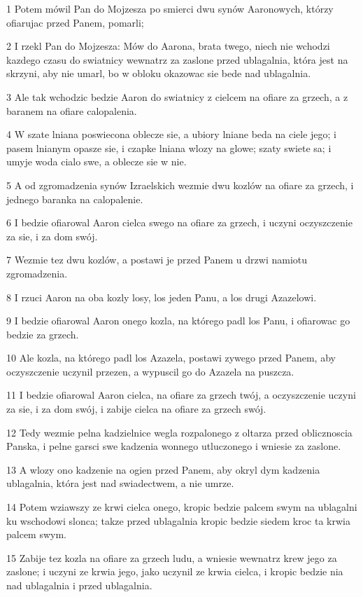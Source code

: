 \par 1 Potem mówil Pan do Mojzesza po smierci dwu synów Aaronowych, którzy ofiarujac przed Panem, pomarli;
\par 2 I rzekl Pan do Mojzesza: Mów do Aarona, brata twego, niech nie wchodzi kazdego czasu do swiatnicy wewnatrz za zaslone przed ublagalnia, która jest na skrzyni, aby nie umarl, bo w obloku okazowac sie bede nad ublagalnia.
\par 3 Ale tak wchodzic bedzie Aaron do swiatnicy z cielcem na ofiare za grzech, a z baranem na ofiare calopalenia.
\par 4 W szate lniana poswiecona oblecze sie, a ubiory lniane beda na ciele jego; i pasem lnianym opasze sie, i czapke lniana wlozy na glowe; szaty swiete sa; i umyje woda cialo swe, a oblecze sie w nie.
\par 5 A od zgromadzenia synów Izraelskich wezmie dwu kozlów na ofiare za grzech, i jednego baranka na calopalenie.
\par 6 I bedzie ofiarowal Aaron cielca swego na ofiare za grzech, i uczyni oczyszczenie za sie, i za dom swój.
\par 7 Wezmie tez dwu kozlów, a postawi je przed Panem u drzwi namiotu zgromadzenia.
\par 8 I rzuci Aaron na oba kozly losy, los jeden Panu, a los drugi Azazelowi.
\par 9 I bedzie ofiarowal Aaron onego kozla, na którego padl los Panu, i ofiarowac go bedzie za grzech.
\par 10 Ale kozla, na którego padl los Azazela, postawi zywego przed Panem, aby oczyszczenie uczynil przezen, a wypuscil go do Azazela na puszcza.
\par 11 I bedzie ofiarowal Aaron cielca, na ofiare za grzech twój, a oczyszczenie uczyni za sie, i za dom swój, i zabije cielca na ofiare za grzech swój.
\par 12 Tedy wezmie pelna kadzielnice wegla rozpalonego z oltarza przed oblicznoscia Panska, i pelne garsci swe kadzenia wonnego utluczonego i wniesie za zaslone.
\par 13 A wlozy ono kadzenie na ogien przed Panem, aby okryl dym kadzenia ublagalnia, która jest nad swiadectwem, a nie umrze.
\par 14 Potem wziawszy ze krwi cielca onego, kropic bedzie palcem swym na ublagalni ku wschodowi slonca; takze przed ublagalnia kropic bedzie siedem kroc ta krwia palcem swym.
\par 15 Zabije tez kozla na ofiare za grzech ludu, a wniesie wewnatrz krew jego za zaslone; i uczyni ze krwia jego, jako uczynil ze krwia cielca, i kropic bedzie nia nad ublagalnia i przed ublagalnia.
